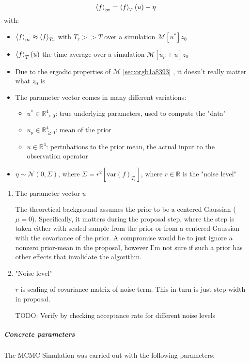 \documentclass[11pt]{article}
\newcommand{\R}{{\mathbb{R}}}
\newcommand{\N}[2]{\mathcal{N}\left(#1,#2\right)}
\begin{document}
$$\expval{f}_\infty = \expval{f}_T(u) + \eta$$
with:
\begin{itemize}
\item \(\expval{f}_\infty \approx \expval{f}_{T_r}\) with \(T_r >> T\) over a simulation \(\mathcal{M}[u^*] z_0\)
\item \(\expval{f}_T(u)\) the time average over a simulation \(\mathcal{M}[u_p + u] z_0\)
\item Due to the ergodic properties of \(\mathcal{M}\) \ref{sec:orgb1a8393} , it doesn't really matter what \(z_0\) is
\item The parameter vector comes in many different variations:
\begin{itemize}
\item \(u^* \in \R^4_{\geq 0}\): true underlying parameters, used to compute the "data"
\item \(u_p \in \R^4_{\geq 0}\): mean of the prior
\item \(u \in \R^4\): pertubations to the prior mean, the actual input to the observation operator
\end{itemize}
\item \(\eta \sim \N{0}{\Sigma}\), where \(\Sigma = r^2 [\text{var}(f)_{T_r}]\),
where \(r \in \R\) is the "noise level"
\end{itemize}

\begin{enumerate}
\item The parameter vector \(u\)
\label{sec:org514b7e7}

The theoretical background assumes the prior to be a centered Gaussian (\(\mu = 0\)).
Specifically, it matters during the proposal step, where the step is taken either with
scaled sample from the prior or from a centered Gaussian with the covariance of the prior.
A compromise would be to just ignore a nonzero prior-mean in the proposal, however I'm not
sure if such a prior has other effects that invalidate the algorithm.

\item "Noise level"
\label{sec:orgee68004}

\(r\) is scaling of covariance matrix of noise term. This in turn is just step-width in proposal.

TODO: Verify by checking acceptance rate for different noise levels
\end{enumerate}

\subparagraph{Concrete parameters}
\label{sec:org5c81b01}

The MCMC-Simulation was carried  out with the following parameters:
\end{document}
